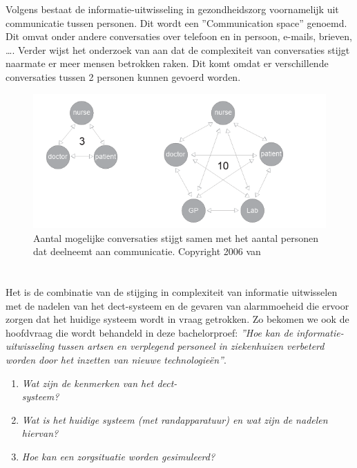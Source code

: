 Volgens \textcite{Coiera2006} bestaat de informatie-uitwisseling in gezondheidszorg voornamelijk uit communicatie tussen personen. Dit wordt een ''Communication space'' genoemd. Dit omvat onder andere conversaties over telefoon en in persoon, e-mails, brieven, \ldots . Verder wijst het onderzoek van \textcite{Coiera2006} aan dat de complexiteit van conversaties stijgt naarmate er meer mensen betrokken raken. Dit komt omdat er verschillende conversaties tussen 2 personen kunnen gevoerd worden.

\begin{figure}[H]
  \includegraphics[width=\linewidth]{../graphics/Number-of-conversations.png}
  \caption{Aantal mogelijke conversaties stijgt samen met het aantal personen dat deelneemt aan communicatie. \autocite[Uit ''Communication Systems in Healthcare'' door][The Clinical Biochemist Reviewss, 27(2) , 90.]{Coiera2006} Copyright 2006 van \textcite{Coiera2006}}
  \label{fig:aantal conversaties}
\end{figure}

\section{}%
\label{sec:onderzoeksvraag}

Het is de combinatie van de stijging in complexiteit van informatie uitwisselen met de nadelen van het \gls{dect}-systeem en de gevaren van alarmmoeheid die ervoor zorgen dat het huidige systeem wordt in vraag getrokken. Zo bekomen we ook de hoofdvraag die wordt behandeld in deze bachelorproef: \textit{''Hoe kan de informatie-uitwisseling tussen artsen en verplegend personeel in ziekenhuizen verbeterd worden door het inzetten van nieuwe technologieën''}.\\

\begin{enumerate}
  \item \textit{Wat zijn de kenmerken van het \gls{dect}-\\systeem?}
  \item \textit{Wat is het huidige systeem (met randapparatuur) en wat zijn de nadelen hiervan?}
  \item \textit{Hoe kan een zorgsituatie worden gesimuleerd?}
\end{enumerate}

